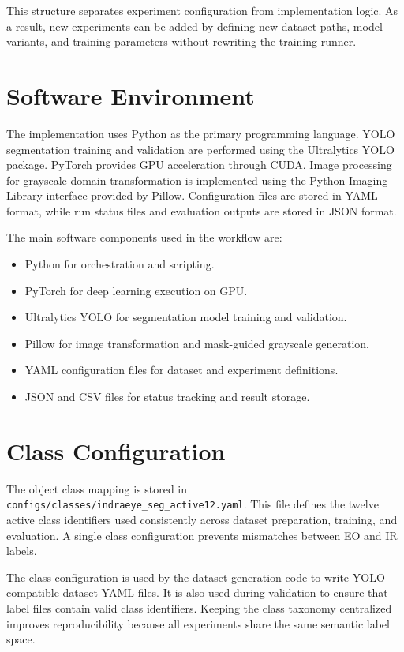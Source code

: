 This structure separates experiment configuration from implementation logic. As a result, new experiments can be added by defining new dataset paths, model variants, and training parameters without rewriting the training runner.

\section{Software Environment}

The implementation uses Python as the primary programming language. YOLO segmentation training and validation are performed using the Ultralytics YOLO package. PyTorch provides GPU acceleration through CUDA. Image processing for grayscale-domain transformation is implemented using the Python Imaging Library interface provided by Pillow. Configuration files are stored in YAML format, while run status files and evaluation outputs are stored in JSON format.

The main software components used in the workflow are:

\begin{itemize}
    \item Python for orchestration and scripting.
    \item PyTorch for deep learning execution on GPU.
    \item Ultralytics YOLO for segmentation model training and validation.
    \item Pillow for image transformation and mask-guided grayscale generation.
    \item YAML configuration files for dataset and experiment definitions.
    \item JSON and CSV files for status tracking and result storage.
\end{itemize}

\section{Class Configuration}

The object class mapping is stored in \texttt{configs/classes/indraeye\_seg\_active12.yaml}. This file defines the twelve active class identifiers used consistently across dataset preparation, training, and evaluation. A single class configuration prevents mismatches between EO and IR labels.

The class configuration is used by the dataset generation code to write YOLO-compatible dataset YAML files. It is also used during validation to ensure that label files contain valid class identifiers. Keeping the class taxonomy centralized improves reproducibility because all experiments share the same semantic label space.


